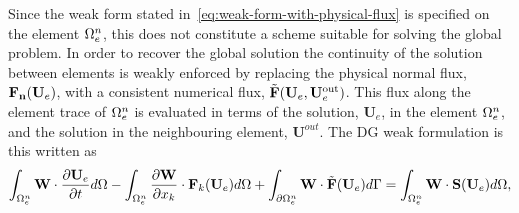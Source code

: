 Since the weak form stated in~\eqref{eq:weak-form-with-physical-flux} is specified on the element $\Omega_e^{n}$, this does not constitute a scheme suitable for solving the global problem. In order to recover the global solution the continuity of the solution between elements is weakly enforced by replacing the physical normal flux, $\mathbf{\mathbf{F}_n}(\mathbf{U}_e)$, with a consistent numerical flux, $\tilde{\mathbf{F}}(\mathbf{U}_e,\mathbf{U}_e^{\textrm{out}})$. This flux along the element trace of $\Omega_e^{n}$ is evaluated in terms of the solution, $\mathbf{U}_e$, in the element $\Omega_e^{n}$, and the solution in the neighbouring element, $\mathbf{U}^{out}$. The DG weak formulation is this written as
\begin{equation}
\int_{\Omega_e^{n}} \mathbf{W} \cdot \frac{\partial \mathbf{U}_e}{\partial t} d\Omega  - \int_{\Omega_e^{n}} \frac{\partial \mathbf{W}}{\partial x_{k}} \cdot
\mathbf{F}_{k}(\mathbf{U}_e) d\Omega + \int_{\partial \Omega_e^{n}} \mathbf{W} \cdot \tilde{\mathbf{F}}(\mathbf{U}_e) d\Gamma
= \int_{\Omega_e^{n}} \mathbf{W} \cdot \mathbf{S}(\mathbf{U}_e) d\Omega,
\label{eq:weak-form-with-numerical-flux}
\end{equation}

